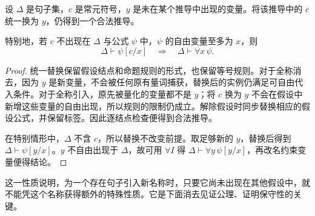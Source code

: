 \documentclass[lang=cn,a4paper,fontset=none,zihao=false,10pt,openany,twoside]{beautybook}
\numberwithin{algorithm}{chapter}
\begin{document}
\begin{lemma}[新常元可以作为任意参数]\label{lem:fresh-constant}
设 $\Delta$ 是句子集，$c$ 是常元符号，$y$ 是未在某个推导中出现的变量。将该推导中的 $c$ 统一换为 $y$，仍得到一个合法推导。

特别地，若 $c$ 不出现在 $\Delta$ 与公式 $\psi$ 中，$\psi$ 的自由变量至多为 $x$，则
\[
 \Delta\vdash\psi[c/x]\quad\Longrightarrow\quad
 \Delta\vdash\forall x\,\psi.
\]
\end{lemma}
\begin{proof}
统一替换保留假设结点和命题规则的形式，也保留等号规则。对于全称消去，因为 $y$ 是新变量，不会被任何原有量词捕获，替换后的实例仍满足可自由代入条件。对于全称引入，原先被量化的变量都不是 $y$；将 $c$ 换为 $y$ 不会在假设中新增这些变量的自由出现，所以规则的限制仍成立。解除假设时同步替换相应的假设公式，并保留标签。因此逐结点检查便得到合法推导。

在特别情形中，$\Delta$ 不含 $c$，所以替换不改变前提。取足够新的 $y$，替换后得到 $\Delta\vdash\psi[y/x]$。$y$ 不自由出现于 $\Delta$，故可用 $\forall I$ 得 $\Delta\vdash\forall y\,\psi[y/x]$，再改名约束变量便得结论。
\end{proof}
这一性质说明，为一个存在句子引入新名称时，只要它尚未出现在其他假设中，就不能凭这个名称获得额外的特殊性质。它是下面消去见证公理、证明保守性的关键。
\end{document}
